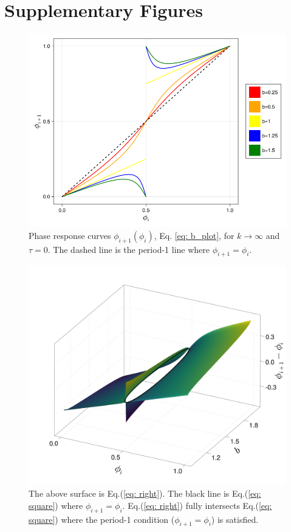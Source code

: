 \section{Supplementary Figures}
\begin{figure}[H]
    \begin{center}
    \includegraphics[width=.7\textwidth]{figures/b_plot.png}
    \end{center}
\caption{Phase response curves $\phi_{i+1}(\phi_i)$, Eq. \ref{eq: b_plot}, for $k\rightarrow\infty$ and $\tau = 0$. The dashed line is the period-1 line where $\phi_{i+1}=\phi_i$.}
\label{b_plot}
\end{figure}

\begin{figure}[H]
    \begin{center}
    \includegraphics[width=.7\textwidth]{figures/eqs17_fig.png}
    \end{center}
\caption{The above surface is Eq.(\ref{eq: right}). The black line is Eq.(\ref{eq: square}) where $\phi_{i+1}=\phi_i$. Eq.(\ref{eq: right}) fully intersects Eq.(\ref{eq: square}) where the period-1 condition ($\phi_{i+1}=\phi_i$) is satisfied.}
\label{instabbound}
\end{figure}

